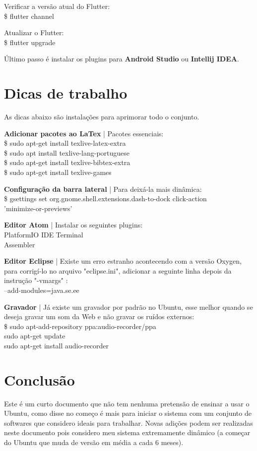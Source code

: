 \documentclass[a4paper,11pt]{article}
\begin{document}
Verificar a versão atual do Flutter: \\
{\ttfamily\$ flutter channel}

Atualizar o Flutter: \\
{\ttfamily\$ flutter upgrade}

Último passo é instalar os plugins para \textbf{Android Studio} ou \textbf{Intellij IDEA}.

\section{Dicas de trabalho}
As dicas abaixo são instalações para aprimorar todo o conjunto.

\textbf{Adicionar pacotes ao LaTex} | Pacotes essenciais: \\
{\ttfamily\$ sudo apt-get install texlive-latex-extra \\
	\$ sudo apt install texlive-lang-portuguese \\
	\$ sudo apt-get install texlive-bibtex-extra \\
	\$ sudo apt-get install texlive-games}

\textbf{Configuração da barra lateral} | Para deixá-la mais dinâmica: \\
{\ttfamily\$ gsettings set org.gnome.shell.extensions.dash-to-dock click-action \\ 'minimize-or-previews'}

\textbf{Editor Atom} | Instalar os seguintes plugins: \\
{\ttfamily PlatformIO IDE Terminal \\
Assembler}

\textbf{Editor Eclipse} | Existe um erro estranho acontecendo com a versão Oxygen, para corrigí-lo no arquivo "eclipse.ini", adicionar a seguinte linha depois da instrução "-vmargs" : \\
{\ttfamily --add-modules=java.se.ee}

\textbf{Gravador} | Já existe um gravador por padrão no Ubuntu, esse melhor quando se deseja gravar um som da Web e não gravar os ruídos externos: \\
{\ttfamily\$ sudo apt-add-repository ppa:audio-recorder/ppa \\
	sudo apt-get update \\
	sudo apt-get install audio-recorder}

\section{Conclusão}
Este é um curto documento que não tem nenhuma pretensão de ensinar a usar o Ubuntu, como disse no começo é mais para iniciar o sistema com um conjunto de softwares que considero ideais para trabalhar. Novas adições podem ser realizadas neste documento pois considero meu sistema extremamente dinâmico (a começar do Ubuntu que muda de versão em média a cada 6 meses). 
\end{document}
